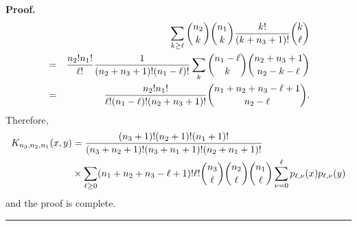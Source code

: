 \documentclass[10pt,a4paper]{amsart}
\newenvironment{proof}[1][Proof]{\noindent\textbf{#1.} }{\ \rule{0.5em}{0.5em}}
\begin{document}
\begin{proof}
\begin{eqnarray*}
&&\sum_{k\geq \ell }{\binom{n_{2}}{k}}{\binom{n_{1}}{k}}\dfrac{k!}{%
(k+n_{3}+1)!}{\binom{k}{\ell }} \\
&=&\dfrac{n_{2}!n_{1}!}{\ell !}\dfrac{1}{(n_{2}+n_{3}+1)!(n_{1}-\ell )!}%
\sum_{k}{\binom{n_{1}-\ell }{k}}{\binom{n_{2}+n_{3}+1}{n_{2}-k-\ell }} \\
&=&\dfrac{n_{2}!n_{1}!}{\ell !(n_{1}-\ell )!(n_{2}+n_{3}+1)!}{\binom{%
n_{1}+n_{2}+n_{3}-\ell +1}{n_{2}-\ell }}.
\end{eqnarray*}%
Therefore, 
\begin{align*}
K_{n_{3},n_{2},n_{1}}(x,y)& =\dfrac{(n_{3}+1)!(n_{2}+1)!(n_{1}+1)!}{%
(n_{3}+n_{2}+1)!(n_{3}+n_{1}+1)!(n_{2}+n_{1}+1)!} \\
& \times \sum_{\ell \geq 0}(n_{1}+n_{2}+n_{3}-\ell +1)!\ell !{\binom{n_{3}}{%
\ell }}{\binom{n_{2}}{\ell }}{\binom{n_{1}}{\ell }}\sum_{\nu =0}^{\ell
}p_{\ell ,\nu }(x)p_{\ell ,\nu }(y)
\end{align*}%
and the proof is complete.
\end{proof}
\end{document}
